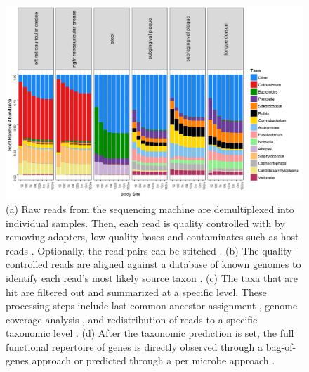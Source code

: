 \documentclass[conference,11pt]{IEEEtran}
\begin{document}
\begin{figure}[hbt]
    \centering
    \includegraphics[width=0.8\linewidth]{fig/hmp_taxa.png}
    \caption{(a) Raw reads from the sequencing machine are demultiplexed into individual samples. Then, each read is quality controlled with by removing adapters, low quality bases and contaminates such as host reads \cite{consortium_structure_2012}. Optionally, the read pairs can be stitched \cite{magoc_flash:_2011}. (b) The quality-controlled reads are aligned against a database of known genomes to identify each read's most likely source taxon \cite{langmead_fast_2012}. (c) The taxa that are hit are filtered out and summarized at a specific level. These processing steps include last common ancestor assignment \cite{hong_pathoscope_2014}, genome coverage analysis \cite{wood_kraken:_2014}, and redistribution of reads to a specific taxonomic level \cite{lu_bracken:_2017}. (d) After the taxonomic prediction is set, the full functional repertoire of genes is directly observed through a bag-of-genes approach or predicted through a per microbe approach \cite{langille_predictive_2013}.}
      \label{fig:hmp_taxa}
\end{figure}
\end{document}
